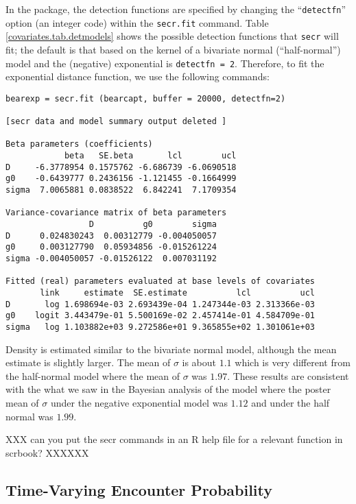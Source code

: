 In the \secr package, the detection functions are specified
by changing the ``\mbox{\tt detectfn}'' option (an integer code)
within the \mbox{\tt secr.fit} command.  Table
\ref{covariates.tab.detmodels} shows the possible detection functions
that \mbox{\tt secr} will fit; the default is that based on the kernel
of a bivariate normal
(``half-normal'') model and the
(negative) exponential is \mbox{\tt detectfn = 2}. Therefore, to fit the
exponential distance function, we use the following commands:

{\small
\begin{verbatim}
bearexp = secr.fit (bearcapt, buffer = 20000, detectfn=2)

[secr data and model summary output deleted ]

Beta parameters (coefficients)
            beta   SE.beta       lcl        ucl
D     -6.3778954 0.1575762 -6.686739 -6.0690518
g0    -0.6439777 0.2436156 -1.121455 -0.1664999
sigma  7.0065881 0.0838522  6.842241  7.1709354

Variance-covariance matrix of beta parameters
                 D          g0        sigma
D      0.024830243  0.00312779 -0.004050057
g0     0.003127790  0.05934856 -0.015261224
sigma -0.004050057 -0.01526122  0.007031192

Fitted (real) parameters evaluated at base levels of covariates
       link     estimate  SE.estimate          lcl          ucl
D       log 1.698694e-03 2.693439e-04 1.247344e-03 2.313366e-03
g0    logit 3.443479e-01 5.500169e-02 2.457414e-01 4.584709e-01
sigma   log 1.103882e+03 9.272586e+01 9.365855e+02 1.301061e+03
\end{verbatim}
}

Density is estimated similar to the bivariate normal model,
although the mean
estimate is slightly larger. The
mean of
$\sigma$ is about $1.1$
 which is very different from the half-normal model where the
 mean of $\sigma$ was $1.97$.
These results are consistent with the what we saw in the Bayesian
analysis of the model where the poster mean of $\sigma$ under the negative
exponential model was $1.12$ and under the half normal was $1.99$.


XXX can you put the secr commands in an R help file for a relevant
function in scrbook? XXXXXX


\subsection{Time-Varying Encounter Probability}

